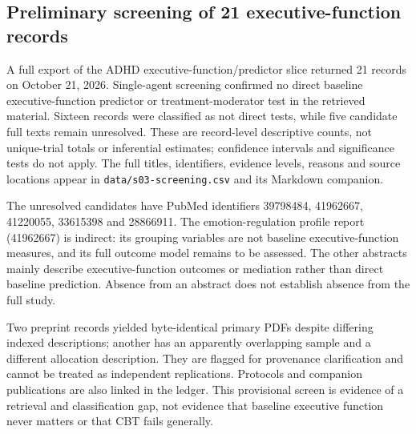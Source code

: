 \subsection{Preliminary screening of 21 executive-function records}
A full export of the ADHD executive-function/predictor slice returned 21 records on October 21, 2026.
Single-agent screening confirmed no direct baseline executive-function predictor or treatment-moderator test in the retrieved material.
Sixteen records were classified as not direct tests, while five candidate full texts remain unresolved.
These are record-level descriptive counts, not unique-trial totals or inferential estimates; confidence intervals and significance tests do not apply.
The full titles, identifiers, evidence levels, reasons and source locations appear in \texttt{data/s03-screening.csv} and its Markdown companion.

The unresolved candidates have PubMed identifiers 39798484, 41962667, 41220055, 33615398 and 28866911.
The emotion-regulation profile report (41962667) is indirect: its grouping variables are not baseline executive-function measures, and its full outcome model remains to be assessed.
The other abstracts mainly describe executive-function outcomes or mediation rather than direct baseline prediction.
Absence from an abstract does not establish absence from the full study.

Two preprint records yielded byte-identical primary PDFs despite differing indexed descriptions; another has an apparently overlapping sample and a different allocation description.
They are flagged for provenance clarification and cannot be treated as independent replications.
Protocols and companion publications are also linked in the ledger.
This provisional screen is evidence of a retrieval and classification gap, not evidence that baseline executive function never matters or that CBT fails generally.
